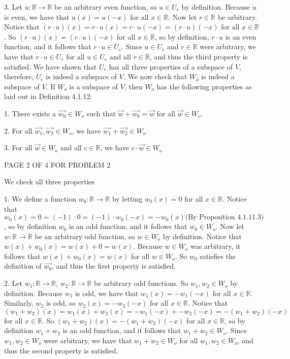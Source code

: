 \documentclass[12pt]{article}
\newenvironment{problem}[2][Problem]
{
	\begin{trivlist} 
		\item[\hskip \labelsep {\bfseries #1 #2:}]
	}
{
	\end{trivlist}
	}
\begin{document}
\begin{problem}{2}
3. Let $u: \mathbb{R} \to \mathbb{R}$ be an arbitrary even function, so $u \in U_e$ by definition. Because $u$ is even, we have that $u(x) = u(-x)$ for all $x \in \mathbb{R}$. Now let $r \in \mathbb{R}$ be arbitrary. Notice that $(r\cdot u)(x) = r\cdot u(x) = r\cdot u(-x) = (r\cdot u)(-x)$ for all $x \in \mathbb{R}$. So $(r\cdot u)(x) = (r\cdot u)(-x)$ for all $x \in \mathbb{R}$, so by definition, $r\cdot u$ is an even function, and it follows that $r\cdot u \in U_e$. Since $u \in U_e$ and  $r\in \mathbb{R}$ were arbitrary, we have that $r \cdot u \in U_e$ for all $u \in U_e$ and all $r \in \mathbb{R}$, and thus the third property is satisfied. 
\noindent
\newline
\newline
We have shown that $U_e$ has all three properties of a subspace of $V$, therefore, $U_e$ is indeed a subspace of $V$.
\newline
\newline
\noindent
We now check that $W_o$ is indeed a subspace of $V$. If $W_o$ is a subspace of $V$, then $W_o$ has the following properties as laid out in Definition 4.1.12:


1. There exists a $\vec{w_0} \in W_o$ such that $\vec{w} + \vec{w_0} = \vec{w}$ for all $\vec{w} \in W_o$.

2. For all $\vec{w_1},\vec{w_2} \in W_o$, we have $\vec{w_1}+\vec{w_2} \in W_o$

3. For all $\vec{w} \in W_o$ and all $c \in \mathbb{R}$, we have $c\cdot \vec{w} \in W_o$
\vfill
\centerline{PAGE 2 OF 4 FOR PROBLEM 2}
\newpage
\noindent
We check all three properties

1. We define a function $w_0 :\mathbb{R} \to \mathbb{R}$ by letting $w_0 (x)=0$ for all $x \in \mathbb{R}$. Notice that $w_0 (x) = 0 = (-1)\cdot 0= (-1)\cdot w_0(-x) = -w_0(x) \text{(By Proposition 4.1.11.3)}$, so by definition $w_0$ is an odd function, and it follows that $w_0 \in W_o$. Now let $w:\mathbb{R} \to \mathbb{R}$ be an arbitrary odd function, so $w \in W_o$ by definition.%
Notice that $w(x) + w_0 (x) = w(x) + 0 = w(x)$. Because $w \in W_o$ was arbitrary, it follows that $w(x)+w_0(x) = w(x)$ for all $w \in W_o$. So $w_0$ satisfies the definition of $\vec{w_0}$, and thus the first property is satisfied.

2. Let $w_1:\mathbb{R} \to \mathbb{R}$, $w_2:\mathbb{R} \to \mathbb{R}$ be arbitrary odd functions. So $w_1,w_2 \in W_o$ by definition. %
Because $w_1$ is odd, we have that $w_1(x) = -w_1 (-x)$ for all $x \in \mathbb{R}$. Similarly, $w_2$ is odd, so $w_2 (x) = -w_2 (-x)$ for all $x \in \mathbb{R}$. Notice that $(w_1 +w_2)(x) = w_1(x) + w_2 (x) = -w_1 (-x) + -w_2 (-x)= -(w_1 +w_2)(-x)$ for all $x \in \mathbb{R}$. So $(w_1+w_2)(x) = -(w_1+w_2)(-x)$ for all $x \in \mathbb{R}$, so by definition $w_1 + w_2$ is an odd function, and it follows that $w_1 + w_2 \in W_o$. Since $w_1,w_2 \in W_o$ were arbitrary, we have that $w_1 + w_2 \in W_o$ for all $w_1,w_2 \in W_o$, and thus the second property is satisfied.


\end{problem}
\end{document}
